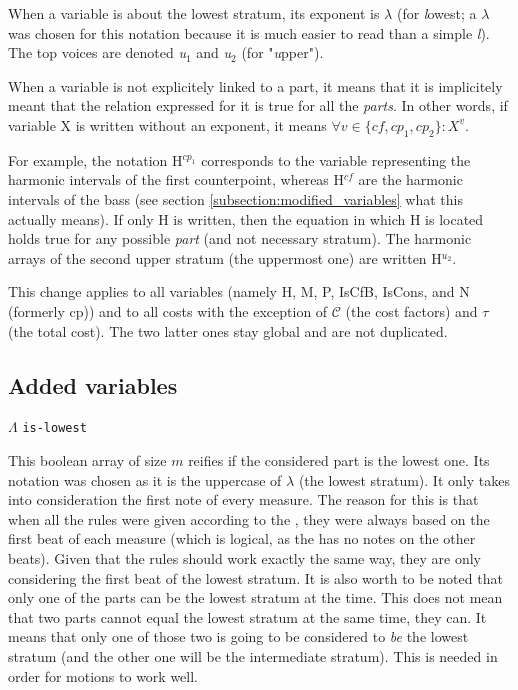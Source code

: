 When a variable is about the lowest stratum, its exponent is \textit{$\lambda$} (for \textit{l}owest; a $\lambda$ was chosen for this notation because it is much easier to read than a simple \textit{l}). The top voices are denoted \textit{u$_1$} and \textit{u$_2$} (for "\textit{u}pper").

When a variable is not explicitely linked to a part, it means that it is implicitely meant that the relation expressed for it is true for all the \textit{parts}. In other words, if variable X is written without an exponent, it means $\forall v \in \{cf, cp_1, cp_2\}: X^v$.

For example, the notation H$^{cp_1}$ corresponds to the variable representing the harmonic intervals of the first counterpoint, whereas H$^{cf}$ are the harmonic intervals of the bass (see section \ref{subsection:modified_variables} what this actually means). If only H is written, then the equation in which H is located holds true for any possible \textit{part} (and not necessary stratum). The harmonic arrays of the second upper stratum (the uppermost one) are written H$^{u_2}$.


This change applies to all variables (namely H, M, P, IsCfB, IsCons, and N (formerly cp)) and to all costs with the exception of $\mathcal{C}$ (the cost factors) and $\tau$ (the total cost). The two latter ones stay global and are not duplicated.

\subsection{Added variables}
\vspace{.5cm} \noindent \textbf{$\Lambda$} \hspace{.cm} \texttt{is-lowest} \label{is-lowest}

This boolean array of size $m$ reifies if the considered part is the lowest one. Its notation was chosen as it is the uppercase of $\lambda$ (the lowest stratum). It only takes into consideration the first note of every measure. The reason for this is that when all the rules were given according to the \cf, they were always based on the first beat of each measure (which is logical, as the \cf has no notes on the other beats). Given that the rules should work exactly the same way, they are only considering the first beat of the lowest stratum.
It is also worth to be noted that only one of the parts can be the lowest stratum at the time. This does not mean that two parts cannot equal the lowest stratum at the same time, they can. It means that only one of those two is going to be considered to \textit{be} the lowest stratum (and the other one will be the intermediate stratum). This is needed in order for motions to work well.

